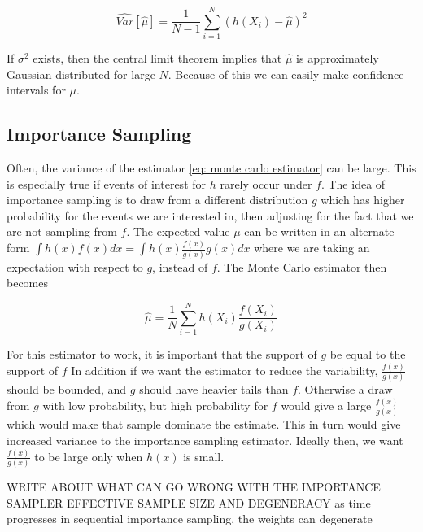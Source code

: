 \begin{equation}
    \widehat{Var}[\hat{\mu}] = \frac{1}{N-1}\sum_{i=1}^N (h(X_i) - \hat{\mu})^2
\end{equation}

If $\sigma^2$ exists, then the central limit theorem implies that $\hat{\mu}$ is approximately Gaussian distributed for large $N$. Because of this we can easily make confidence intervals for $\mu$.


\subsection{Importance Sampling}
\label{chap: importance sampling}
Often, the variance of the estimator \ref{eq: monte carlo estimator} can be large. This is especially true if events of interest for $h$ rarely occur under $f$. The idea of importance sampling is to draw from a different distribution $g$ which has higher probability for the events we are interested in, then adjusting for the fact that we are not sampling from $f$. The expected value $\mu$ can be written in an alternate form $\int h(x)f(x)dx = \int h(x)\frac{f(x)}{g(x)}g(x) dx$ where we are taking an expectation with respect to $g$, instead of $f$. The Monte Carlo estimator then becomes

\begin{equation}
    \hat{\mu} = \frac{1}{N} \sum_{i=1}^N h(X_i)\frac{f(X_i)}{g(X_i)}
\end{equation}

For this estimator to work, it is important that the support of $g$ be equal to the support of $f$
In addition if we want the estimator to reduce the variability, $\frac{f(x)}{g(x)}$ should be bounded, and $g$ should have heavier tails than $f$. Otherwise a draw from $g$ with low probability, but high probability for $f$ would give a large $\frac{f(x)}{g(x)}$ which would make that sample dominate the estimate. This in turn would give increased variance to the importance sampling estimator. Ideally then,  we want $\frac{f(x)}{g(x)}$ to be large only when $h(x)$ is small. \parencite{givens2013computational}






WRITE ABOUT WHAT CAN GO WRONG WITH THE IMPORTANCE SAMPLER
EFFECTIVE SAMPLE SIZE AND DEGENERACY
as time progresses in sequential importance sampling, the weights can degenerate


